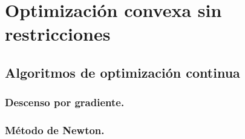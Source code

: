 \section{Optimización convexa sin restricciones}

\subsection{Algoritmos de optimización continua}

\subsubsection{Descenso por gradiente.}

\subsubsection{Método de Newton.}
